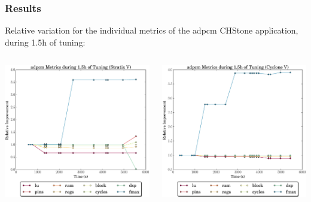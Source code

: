 \documentclass[10pt, compress, aspectratio=169]{beamer}
\begin{document}
\begin{frame}
    \frametitle{Results}
    Relative variation for the \alert{individual metrics} of the \alert{adpcm}
    CHStone application, during \alert{1.5h of tuning}:
    \begin{columns}[T,onlytextwidth]
        \begin{center}
            \includegraphics[width=.92\textwidth]{adpcm_all_5400_chstone_StratixV}
        \end{center}

        \begin{center}
            \includegraphics[width=.92\textwidth]{adpcm_all_5400_chstone_CycloneV}
        \end{center}

    \end{columns}
\end{frame}
\end{document}
